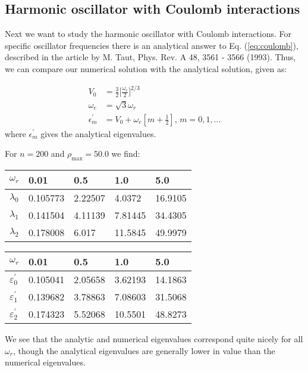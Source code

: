 \documentclass{article}
\begin{document}
\begin{multicols}{2}
\subsection{Harmonic oscillator with Coulomb interactions}
Next we want to study the harmonic oscillator with Coulomb interactions. For specific oscillator frequencies there is an analytical answer to Eq. (\ref{eq:coulomb}), described in the article by M. Taut, Phys. Rev. A 48, 3561 - 3566 (1993). Thus, we can compare our numerical solution with the analytical solution, given as:

\begin{equation}
\begin{aligned}
	V_0 &= \frac{3}{2} \bigg[ \frac{\omega_r}{2} \bigg]^{2/3} \\
	\omega_e &= \sqrt{3} \omega_r \\
	\epsilon_m^{'} &= V_0 + \omega_e [m + \frac{1}{2}] \textrm{,       } m = 0,1, \dots
\end{aligned}
\end{equation}
where $\epsilon_m^{'}$ gives the analytical eigenvalues.

For $n = 200$ and $\rho_{\textrm{max}} = 50.0$ we find:

\begin{center}
\begin{tabular}{ l l l l l }\hline
	$\omega_r$ 	& 0.01		& 0.5		& 1.0	&5.0\\ \hline
	$\lambda_0$ 	& 0.105773	& 2.22507		& 4.0372	& 16.9105\\
	$\lambda_1$ 	& 0.141504	& 4.11139		& 7.81445	& 34.4305 \\
	$\lambda_2$ 	& 0.178008	& 6.017		& 11.5845	& 49.9979\\
	\hline
\end{tabular}
\end{center}

\begin{center}
\begin{tabular}{ l l l l l }\hline
	$\omega_r$ 	& 0.01		& 0.5				& 1.0		&5.0\\ \hline
	$\varepsilon_0^{'}$ 	& 0.105041	& 2.05658		& 3.62193	& 14.1863\\
	$\varepsilon_1^{'}$ 	& 0.139682	& 3.78863		& 7.08603& 31.5068 \\
	$\varepsilon_2^{'}$ 	& 0.174323	& 5.52068		& 10.5501	& 48.8273\\
	\hline
\end{tabular}
\end{center}
We see that the analytic and numerical eigenvalues correspond quite nicely for all $\omega_r$, though the analytical eigenvalues are generally lower in value than the numerical eigenvalues.


\end{multicols}
\end{document}
